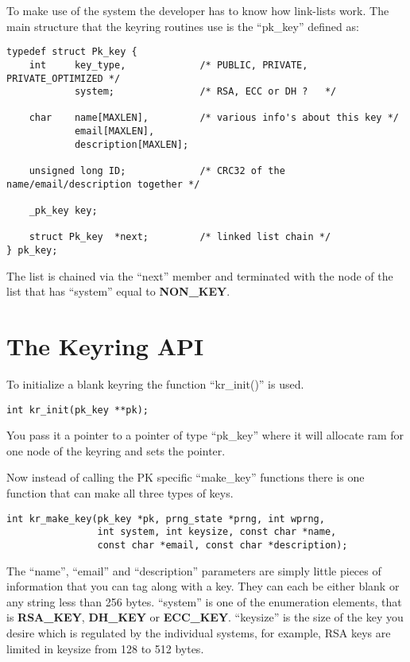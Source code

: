 \documentclass[b5paper]{book}
\begin{document}
To make use of the system the developer has to know how link-lists work.  The main structure that the keyring routines use 
is the ``pk\_key'' defined as:
\begin{small}
\begin{verbatim}
typedef struct Pk_key {
    int     key_type,             /* PUBLIC, PRIVATE, PRIVATE_OPTIMIZED */
            system;               /* RSA, ECC or DH ?   */

    char    name[MAXLEN],         /* various info's about this key */
            email[MAXLEN],
            description[MAXLEN];

    unsigned long ID;             /* CRC32 of the name/email/description together */

    _pk_key key;

    struct Pk_key  *next;         /* linked list chain */
} pk_key;
\end{verbatim}
\end{small}

The list is chained via the ``next'' member and terminated with the node of the list that has ``system'' equal to 
{\bf NON\_KEY}.

\section{The Keyring API}
To initialize a blank keyring the function ``kr\_init()'' is used.
\begin{verbatim}
int kr_init(pk_key **pk);
\end{verbatim}
You pass it a pointer to a pointer of type ``pk\_key'' where it will allocate ram for one node of the keyring and sets the
pointer.

Now instead of calling the PK specific ``make\_key'' functions there is one function that can make all three types of keys.
\begin{verbatim}
int kr_make_key(pk_key *pk, prng_state *prng, int wprng, 
                int system, int keysize, const char *name,
                const char *email, const char *description);
\end{verbatim}
The ``name'', ``email'' and ``description'' parameters are simply little pieces of information that you can tag along with a
key.  They can each be either blank or any string less than 256 bytes.  ``system'' is one of the enumeration elements, that
is {\bf RSA\_KEY}, {\bf DH\_KEY} or {\bf ECC\_KEY}.  ``keysize'' is the size of the key you desire which is regulated by
the individual systems, for example, RSA keys are limited in keysize from 128 to 512 bytes.
\end{document}
